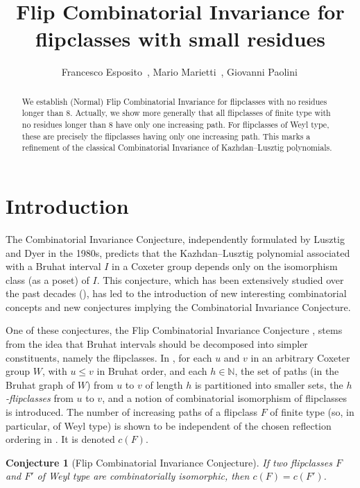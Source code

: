 \documentclass[12pt,reqno]{amsart}
\title[]{Flip Combinatorial Invariance for flipclasses with small residues}
\author[Esposito, Marietti, Paolini]{Francesco Esposito\, \orcidlink{0000-0003-4627-9193}, Mario Marietti\, \orcidlink{0000-0001-7045-0347}, Giovanni Paolini\, \orcidlink{0000-0002-3964-9101}}
\date{}
\theoremstyle{plain}
\newtheorem{con}[thm]{Conjecture}
\theoremstyle{definition}
\theoremstyle{remark}
\begin{document}
\maketitle


\begin{abstract}
We establish (Normal) Flip Combinatorial Invariance for flipclasses with no residues longer than 8. Actually, we show more generally that all flipclasses of finite type with no residues longer than 8 have only one increasing path. For flipclasses of Weyl type, these are precisely the flipclasses having only one increasing path. This marks a refinement of the classical Combinatorial Invariance of Kazhdan--Lusztig polynomials.
\end{abstract}

\section{Introduction}
The  Combinatorial Invariance Conjecture,   independently formulated by Lusztig and Dyer in the 1980s,  predicts that the Kazhdan--Lusztig polynomial associated with a Bruhat interval $I$ in a Coxeter group depends only on the isomorphism class (as a poset) of $I$. 
This conjecture, which has been extensively studied over the past decades (\cite{B-G,BGL,BBDVW,Bre03,Bre04,BCM1,BCM2, B-M,BLP,CM, CMult,Del,dC,EM,EM2,EMS,G-W,Inc,Inc2,
MJoA,MJaco,Mtrans,M,P}), has led to the introduction of new interesting combinatorial concepts and new conjectures implying the Combinatorial Invariance Conjecture.

One of these conjectures, the Flip Combinatorial Invariance Conjecture \cite{EMS}, stems from the idea that Bruhat intervals should be decomposed into  simpler constituents, namely the flipclasses. In \cite{EMS},
for each $u$ and $v$  in an arbitrary Coxeter group $W$, with $u\leq v$ in Bruhat order, and each $h \in \mathbb N$,  the set of paths (in the Bruhat graph of $W$) from $u$ to $v$ of length $h$ is partitioned  into smaller sets, the {\em $h$-flipclasses} from $u$ to $v$, and a notion of combinatorial isomorphism of flipclasses is introduced.
The number of increasing paths of a flipclass $F$ of finite type (so, in particular, of Weyl type) is shown to be independent of the chosen reflection ordering in \cite[Theorem~5.1/Proposition 6.7]{EMS}. It is denoted $c(F)$.
\begin{con}[Flip Combinatorial Invariance Conjecture]
If two flipclasses $F$ and $F'$ of Weyl type are combinatorially isomorphic, then $c(F)=c(F')$. 
\end{con}
\end{document}
